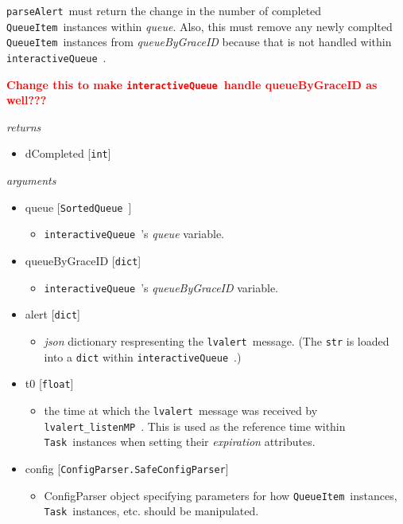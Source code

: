 \documentclass{article}
\newcommand{\FIXME}[1]{\textcolor{red}{\textbf{#1}}}
\newcommand{\alert}{\texttt{lvalert}~}
\newcommand{\lvalertListenMP}{\texttt{lvalert\_listenMP}~}
\newcommand{\interactiveQueue}{\texttt{interactiveQueue}~}
\newcommand{\parseAlert}{\texttt{parseAlert}~}
\newcommand{\SortedQueue}{\texttt{SortedQueue}~}
\newcommand{\QueueItem}{\texttt{QueueItem}~}
\newcommand{\Task}{\texttt{Task}~}
\begin{document}
\parseAlert must return the change in the number of completed \QueueItem instances within \textit{queue}.
Also, this must remove any newly complted \QueueItem instances from \textit{queueByGraceID} because that is not handled within \interactiveQueue.

\FIXME{Change this to make \interactiveQueue handle queueByGraceID as well???}

\vspace{0.5cm}
\noindent
\textit{returns}

\begin{itemize}
    \item{dCompleted [\texttt{int}]}
\end{itemize}

\noindent
\textit{arguments}

\begin{itemize} 
    \item{queue [\SortedQueue]
        \begin{itemize}
            \item{\interactiveQueue's \textit{queue} variable.}
        \end{itemize}
         }
    \item{queueByGraceID [\texttt{dict}]
        \begin{itemize}
            \item{\interactiveQueue's \textit{queueByGraceID} variable.}
        \end{itemize}
         }
    \item{alert [\texttt{dict}]
        \begin{itemize}
            \item{\textit{json} dictionary respresenting the \alert message. (The \texttt{str} is loaded into a \texttt{dict} within \interactiveQueue.)}
        \end{itemize}
         }
    \item{t0 [\texttt{float}]
        \begin{itemize}
            \item{the time at which the \alert message was received by \lvalertListenMP. This is used as the reference time within \Task instances when setting their \textit{expiration} attributes.}
        \end{itemize}
         }
    \item{config [\texttt{ConfigParser.SafeConfigParser}]
        \begin{itemize}
            \item{ConfigParser object specifying parameters for how \QueueItem instances, \Task instances, etc. should be manipulated.}
        \end{itemize}
         }
\end{itemize}
\end{document}
